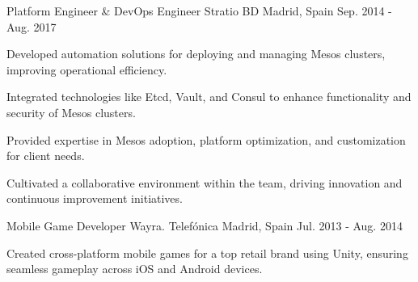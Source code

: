 \begin{cventries}
  \cventry
    {Platform Engineer \& DevOps Engineer} %
    {Stratio BD} %
    {Madrid, Spain} %
    {Sep. 2014 - Aug. 2017} %
    {
      \begin{cvitems} %
        \item {Developed automation solutions for deploying and managing Mesos clusters, improving operational efficiency.}
        \item {Integrated technologies like Etcd, Vault, and Consul to enhance functionality and security of Mesos clusters.}
        \item {Provided expertise in Mesos adoption, platform optimization, and customization for client needs.}
        \item {Cultivated a collaborative environment within the team, driving innovation and continuous improvement initiatives.}
      \end{cvitems}
    }

  \cventry
    {Mobile Game Developer} %
    {Wayra. Telefónica} %
    {Madrid, Spain} %
    {Jul. 2013 - Aug. 2014} %
    {
      \begin{cvitems} %
        \item {Created cross-platform mobile games for a top retail brand using Unity, ensuring seamless gameplay across iOS and Android devices.}
      \end{cvitems}
    }

\end{cventries}
